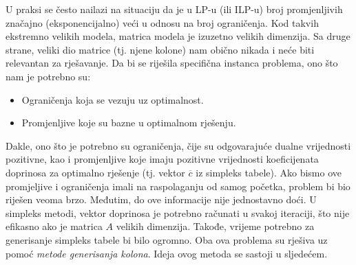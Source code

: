 \documentclass[a4paper, utf8, 11pt, colorlinks]{book}
\theoremstyle{definition}
\begin{document}
U praksi se često nailazi  na situaciju da je u LP-u (ili ILP-u) broj promjenljivih značajno (eksponencijalno) veći  u odnosu na broj ograničenja. Kod takvih ekstremno velikih modela, matrica modela je izuzetno velikih dimenzija. Sa druge strane, veliki dio matrice (tj. njene kolone) nam obično nikada i neće biti relevantan za rješavanje. Da bi se riješila specifična instanca problema, ono što nam je potrebno su:
\begin{itemize}
    \item Ograničenja koja se vezuju uz optimalnost.
    \item Promjenljive koje su bazne u optimalnom rješenju.
\end{itemize}
Dakle, ono što je potrebno su ograničenja, čije su odgovarajuće dualne vrijednosti pozitivne, kao i promjenljive koje imaju pozitivne vrijednosti koeficijenata doprinosa za optimalno rješenje (tj. vektor  $\overline{c}$ iz simpleks tabele). Ako bismo  ove promjeljive i ograničenja imali na raspolaganju od samog početka, problem bi bio riješen veoma brzo. Međutim, do ove informacije nije jednostavno doći.  U simpleks metodi, vektor doprinosa je potrebno računati u svakoj iteraciji, što nije efikasno ako je matrica $A$ velikih dimenzija. Takođe, vrijeme potrebno za generisanje simpleks tabele bi bilo ogromno.  Oba ova problema su rješiva uz pomoć \emph{metode generisanja kolona}.  Ideja ovog metoda se sastoji u sljedećem. 

\end{document}
